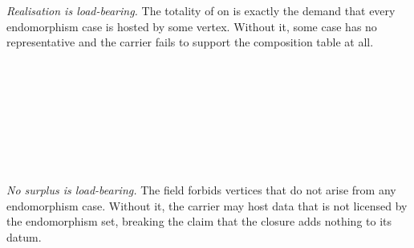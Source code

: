 \documentclass[11pt]{article}
\begin{document}
\emph{Realisation is load-bearing.}  The totality of
 on  is exactly the demand
that every endomorphism case is hosted by some vertex.  Without it,
some case has no representative and the carrier fails to support the
composition table at all.

\begin{code}%
\>[0]\<%
\\
\>[0]\AgdaSpace{}%
\AgdaSymbol{:}\<%
\\
\>[0][@{}l@{\AgdaIndent{0}}]%
\>[2]\AgdaSymbol{(}\AgdaSpace{}%
\AgdaSymbol{:}\AgdaSpace{}%
\AgdaSymbol{)}\AgdaSpace{}%
\<%
\\
%
\>[2]\AgdaSymbol{(}\AgdaSpace{}%
\AgdaSymbol{:}\AgdaSpace{}%
\AgdaSymbol{)}\AgdaSpace{}%
\<%
\\
%
\>[2]%
\>[2098I]\AgdaSymbol{(}\AgdaSpace{}%
\AgdaSymbol{(}\AgdaSpace{}%
\AgdaSymbol{))}\<%
\\
\>[.][@{}l@{}]\<[2098I]%
\>[4]\AgdaSpace{}%
\AgdaSpace{}%
\AgdaSpace{}%
\AgdaSpace{}%
\AgdaSymbol{(}\AgdaSpace{}%
\AgdaSymbol{)}\AgdaSpace{}%
\AgdaSpace{}%
\AgdaSpace{}%
\AgdaSymbol{)}\<%
\\
\>[0]\AgdaSpace{}%
\AgdaSpace{}%
\AgdaSpace{}%
\AgdaSymbol{=}\<%
\\
\>[0][@{}l@{\AgdaIndent{0}}]%
\>[2]\AgdaSpace{}%
\AgdaSymbol{(}\AgdaSpace{}%
\AgdaSymbol{)}\AgdaSpace{}%
\AgdaSpace{}%
\AgdaOperator{\AgdaInductiveConstructor{,}}\AgdaSpace{}%
\<%
\end{code}

\emph{No surplus is load-bearing.}  The field 
forbids vertices that do not arise from any endomorphism case.  Without
it, the carrier may host data that is not licensed by the endomorphism
set, breaking the claim that the closure adds nothing to its datum.
\end{document}
